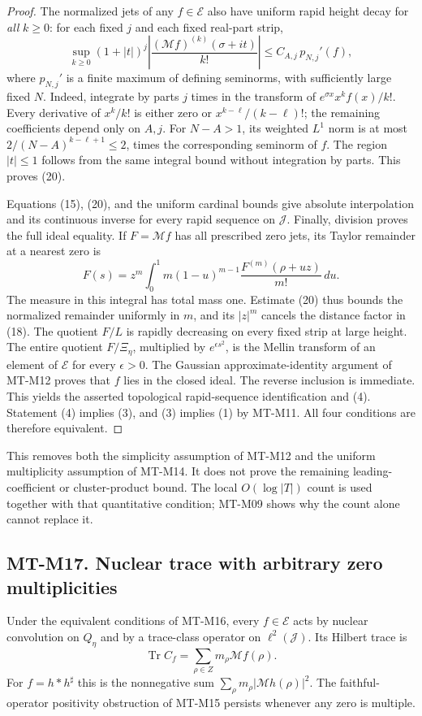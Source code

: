 \begin{proof}
The normalized jets of any $f\in\mathcal E$ also have
uniform rapid height decay for \emph{all} $k\ge0$:
for each fixed $j$ and each fixed real-part strip,
\[
 \sup_{k\ge0}
 (1+|t|)^j\left|\frac{(\mathcal Mf)^{(k)}(\sigma+it)}{k!}\right|
                    \le C_{A,j}\,p_{N,j}'(f),          \tag{20}
\]
where $p_{N,j}'$ is a finite maximum of defining
seminorms, with sufficiently large fixed $N$.
Indeed, integrate by parts $j$ times in the transform
of $e^{\sigma x}x^k f(x)/k!$.
Every derivative of $x^k/k!$ is either zero or
$x^{k-\ell}/(k-\ell)!$; the remaining coefficients
depend only on $A,j$. For $N-A>1$, its weighted
$L^1$ norm is at most
$2/(N-A)^{k-\ell+1}\le2$, times the corresponding
seminorm of $f$. The region $|t|\le1$ follows from
the same integral bound without integration by parts.
This proves (20).

Equations (15), (20), and the uniform cardinal bounds
give absolute interpolation and its continuous inverse
for every rapid sequence on $\mathcal J$.
Finally, division proves the full ideal equality.
If $F=\mathcal Mf$ has all prescribed zero jets, its
Taylor remainder at a nearest zero is
\[
 F(s)=z^m\int_0^1m(1-u)^{m-1}
                  \frac{F^{(m)}(\rho+uz)}{m!}\,du .
 \]
The measure in this integral has total mass one.
Estimate (20) thus bounds the normalized remainder
uniformly in $m$, and its $|z|^m$ cancels the distance
factor in (18). The quotient $F/L$ is rapidly
decreasing on every fixed strip at large height.
The entire quotient $F/\Xi_\eta$, multiplied by
$e^{\epsilon s^2}$, is the Mellin transform of an
element of $\mathcal E$ for every $\epsilon>0$.
The Gaussian approximate-identity argument of
MT-M12 proves that $f$ lies in the closed ideal.
The reverse inclusion is immediate.
This yields the asserted topological rapid-sequence
identification and (4). Statement (4) implies (3),
and (3) implies (1) by MT-M11. All four conditions
are therefore equivalent.
\end{proof}

This removes both the simplicity assumption of MT-M12 and the
uniform multiplicity assumption of MT-M14. It does not prove the
remaining leading-coefficient or cluster-product bound.
The local $O(\log|T|)$ count is used together with that
quantitative condition; MT-M09 shows why the count alone
cannot replace it.

\subsection*{MT-M17. Nuclear trace with arbitrary zero multiplicities}
Under the equivalent conditions of MT-M16, every
$f\in\mathcal E$ acts by nuclear convolution on $Q_\eta$
and by a trace-class operator on $\ell^2(\mathcal J)$.
Its Hilbert trace is
\[
       \operatorname{Tr}C_f
                  =\sum_{\rho\in Z}m_\rho\mathcal Mf(\rho).
\]
For $f=h*h^\sharp$ this is the nonnegative sum
$\sum_\rho m_\rho|\mathcal Mh(\rho)|^2$.
The faithful-operator positivity obstruction of MT-M15
persists whenever any zero is multiple.

